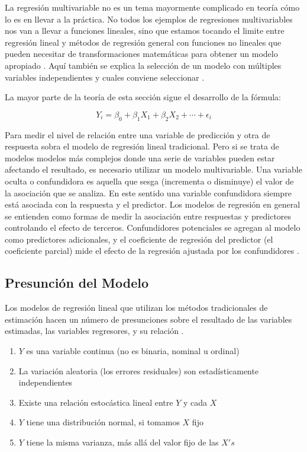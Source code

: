 La regresión multivariable no es un tema mayormente complicado en teoría cómo lo es en llevar a la práctica. No todos los ejemplos de regresiones multivariables nos van a llevar a funciones lineales, sino que estamos tocando el limite entre regresión lineal y métodos de regresión general con funciones no lineales que pueden necesitar de transformaciones matemáticas para obtener un modelo apropiado \cite{daroczi}. Aquí también se explica la selección de un modelo con múltiples variables independientes y cuales conviene seleccionar \cite{viswanathan}.

La mayor parte de la teoría de esta sección sigue el desarrollo de la fórmula:

\begin{equation}
	Y_{i} = \beta_{0} + \beta_{1}X_{1} + \beta_{2}X_{2} + \cdots + \epsilon_{i}
\end{equation}

Para medir el nivel de relación entre una variable de predicción y otra de respuesta sobra el modelo de regresión lineal tradicional. Pero si se trata de modelos modelos más complejos donde una serie de variables pueden estar afectando el resultado, es necesario utilizar un modelo multivariable. Una variable oculta \cite{estadisticaBasica} o confundidora \cite{daroczi} es aquella que sesga (incrementa o disminuye) el valor de la asociación que se analiza. En este sentido una variable confundidora siempre está asociada con la respuesta y el predictor. Los modelos de regresión en general se entienden como formas de medir la asociación entre respuestas y predictores controlando el efecto de terceros. Confundidores potenciales se agregan al modelo como predictores adicionales, y el coeficiente de regresión del predictor (el coeficiente parcial) mide el efecto de la regresión ajustada por los confundidores \cite{daroczi}.

\subsection{Presunción del Modelo}
Los modelos de regresión lineal que utilizan los métodos tradicionales de estimación hacen un número de presunciones sobre el resultado de las variables estimadas, las variables regresores, y su relación \cite{daroczi}.

\begin{enumerate}
    \item $Y$ es una variable continua (no es binaria, nominal u ordinal)
    \item La variación aleatoria (los errores residuales) son estadísticamente independientes
    \item Existe una relación estocástica lineal entre $Y$ y cada $X$
    \item $Y$ tiene una distribución normal, si tomamos $X$ fijo
    \item $Y$ tiene la misma varianza, más allá del valor fijo de las $X's$
\end{enumerate}

